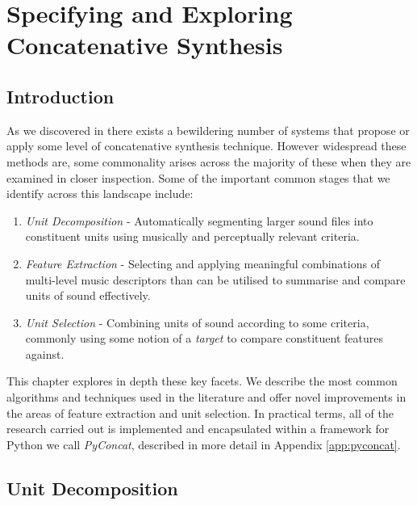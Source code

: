 \chapter{Specifying and Exploring Concatenative Synthesis}
\label{chap:pyconcat}

\section{Introduction}

As we discovered in  there exists a bewildering number of systems that propose or apply some level of concatenative synthesis technique. However widespread these methods are, some commonality arises across the majority of these when they are examined in closer inspection. Some of the important common stages that we identify across this landscape include: 

\begin{enumerate}
  \item \textit{Unit Decomposition} - Automatically segmenting larger sound files into constituent units using musically and perceptually relevant criteria.
  \item \textit{Feature Extraction} - Selecting and applying meaningful combinations of multi-level music descriptors than can be utilised to summarise and compare units of sound effectively.
  \item \textit{Unit Selection} - Combining units of sound according to some criteria, commonly using some notion of a \textit{target} to compare constituent features against.  
\end{enumerate}

This chapter explores in depth these key facets. We describe the most common algorithms and techniques used in the literature and offer novel improvements in the areas of feature extraction and unit selection. In practical terms, all of the research carried out is implemented and encapsulated within a framework for Python we call \textit{PyConcat}, described in more detail in Appendix  \ref{app:pyconcat}. 

\section{Unit Decomposition}

\label{sec:decomposition}

